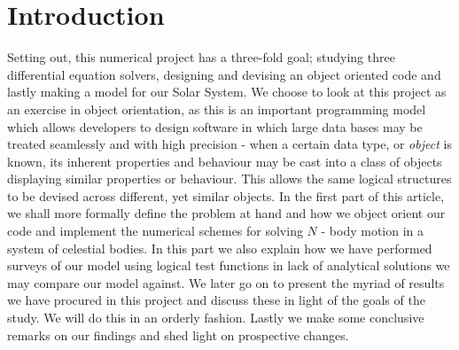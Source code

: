 \section{Introduction}
  
    
    Setting out, this numerical project has a three-fold goal; studying three differential equation solvers, designing and devising an object oriented code and lastly making a model for our Solar System. We choose to look at this project as an exercise in object orientation, as this is an important programming model which allows developers to design software in which large data bases may be treated seamlessly and with high precision - when a certain data type, or \textit{object} is known, its inherent properties and behaviour may be cast into a class of objects displaying similar properties or behaviour. This allows the same logical structures to be devised across different, yet similar objects. In the first part of this article, we shall more formally define the problem at hand and how we object orient our code and implement the numerical schemes for solving $N$ - body motion in a system of celestial bodies. In this part we also explain how we have performed surveys of our model using logical test functions in lack of analytical solutions we may compare our model against. We later go on to present the myriad of results we have procured in this project and discuss these in light of the goals of the study. We will do this in an orderly fashion. Lastly we make some conclusive remarks on our findings and shed light on prospective changes.  
